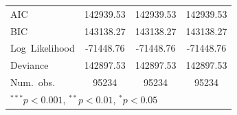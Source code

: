 \documentclass[12pt,twoside]{reedthesis}
\begin{document}
\begin{table}
\begin{center}
\begin{footnotesize}
\begin{tabular}{l@{} c@{} c@{} c@{} }
  AIC                                & 142939.53              & 142939.53              & 142939.53              \\
  BIC                                & 143138.27              & 143138.27              & 143138.27              \\
  Log\ Likelihood                    & -71448.76              & -71448.76              & -71448.76              \\
  Deviance                           & 142897.53              & 142897.53              & 142897.53              \\
  Num.\ obs.                         & 95234                  & 95234                  & 95234                  \\
  \bottomrule
  \multicolumn{4}{l}{\tiny{$^{***}p<0.001$, $^{**}p<0.01$, $^*p<0.05$}}
  \end{tabular}
  \end{footnotesize}
  \label{table:coefficients}
  \end{center}
  \end{table}
  
\end{document}

